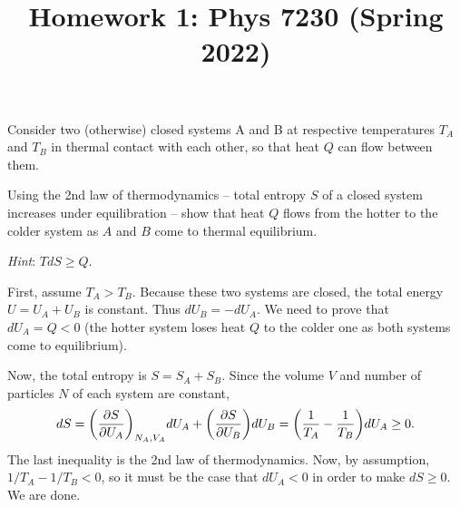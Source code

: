 \documentclass[12pt]{article}
\title{Homework 1: Phys 7230 (Spring 2022)}
\begin{document}
\maketitle
\begin{problem}{1}
Consider two (otherwise) closed systems A and B at respective temperatures $T_A$
and $T_B$ in thermal contact with each other, so that heat $Q$ can flow between
them.

Using the 2nd law of thermodynamics -- total entropy $S$ of a closed system
increases under equilibration -- show that heat $Q$ flows from the hotter to the
colder system as $A$ and $B$ come to thermal equilibrium.

\textit{Hint}: $TdS\geq Q$.

\begin{solution}
First, assume $T_A>T_B$. Because these two systems are closed, the total energy
$U=U_A+U_B$ is constant. Thus $dU_B=-dU_A$. We need to prove that
$dU_A=Q<0$ (the hotter system loses heat $Q$ to the colder one as both systems 
come to equilibrium).

Now, the total entropy is $S=S_A+S_B$. Since the volume $V$ and number of
particles $N$ of each system are constant,
\begin{equation}
    dS=\qty(\frac{\partial S}{\partial U_A})_{N_A,V_A}dU_A
    +\qty(\frac{\partial S}{\partial U_B})dU_B
    =\qty(\frac1{T_A}-\frac1{T_B})dU_A\geq 0.
\end{equation}
The last inequality is the 2nd law of thermodynamics. Now, by assumption,
$1/T_A-1/T_B<0$, so it must be the case that $dU_A<0$ in order to make $dS\geq
0$. We are done.
\end{solution}
\end{problem}
\newpage
\end{document}
